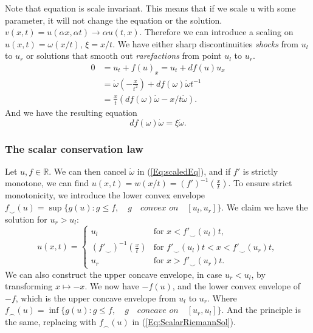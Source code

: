 \documentclass[10pt]{article}
\numberwithin{equation}{section}
\begin{document}
Note that equation is scale invariant. This means that if we scale u with some parameter, it will not change the equation or the solution. $v(x,t) = u(\alpha x, \alpha t) \rightarrow \alpha u(t,x)$. Therefore we can introduce a scaling on $u(x,t) = \omega (x/t) $, $ \xi = x/t$. We have either sharp discontinuities \textit{shocks} from $u_l$ to $u_r$ or solutions that smooth out \textit{rarefactions} from point $u_l$ to $u_r$. 
 \begin{equation*}
     \begin{split}
         0 &= u_t + f(u)_x = u_t + df(u)u_x \\
           &= \dot \omega( -\frac{x}{t^2}) + df( \omega) \dot \omega t^{-1} \\
           &= \frac{x}{t}(  df( \omega) \dot \omega - x/t \dot \omega ).
     \end{split}
 \end{equation*}
 And we have the resulting equation 
 \begin{equation}
     df( \omega) \dot \omega =  \xi \dot \omega.
     \label{Eq:scaledEq}
 \end{equation}

\subsubsection{The scalar conservation law}
Let $u,f \in \mathbb{R}$. We can then cancel $\dot \omega $ in (\ref{Eq:scaledEq}), and if $f'$ is strictly monotone, we can find $u(x,t) = w(x/t) = (f')^{-1}(\frac{x}{t})$. 
To ensure strict monotonicity, we introduce the lower convex envelope $f_{\smile}(u) = \sup\{g(u) : g\leq f, \quad  g \quad \textit{convex on}\quad [u_l, u_r]\} $. We claim we have the solution for $u_r > u_l$:
 \begin{equation}
     u(x,t) = \begin{cases} u_l & \text{for $x < f'_{\smile} (u_l)t$,}\\
                            (f'_{\smile} )^{-1}(\frac{x}{t}) & \text{for $f'_{\smile} (u_l)t$} < x < f'_{\smile} (u_r)t,\\ 
                            u_r & \text{for $x > f'_{\smile} (u_r)t$}. 
     \end{cases}
     \label{Eq:ScalarRiemannSol}
 \end{equation}
We can also construct the upper concave envelope, in case $u_r < u_l$, by transforming $x \mapsto -x$. We now have $-f(u)$, and the lower convex envelope of $-f$, which is the upper concave envelope from $u_l$ to $u_r$.  Where $f_{\frown}(u) = \inf\{g(u) : g\leq f, \quad g \quad \textit{concave on} \quad  [u_r, u_l]\} $. And the principle is the same, replacing with $f_{\frown}(u)$ in (\ref{Eq:ScalarRiemannSol}). 
\end{document}
